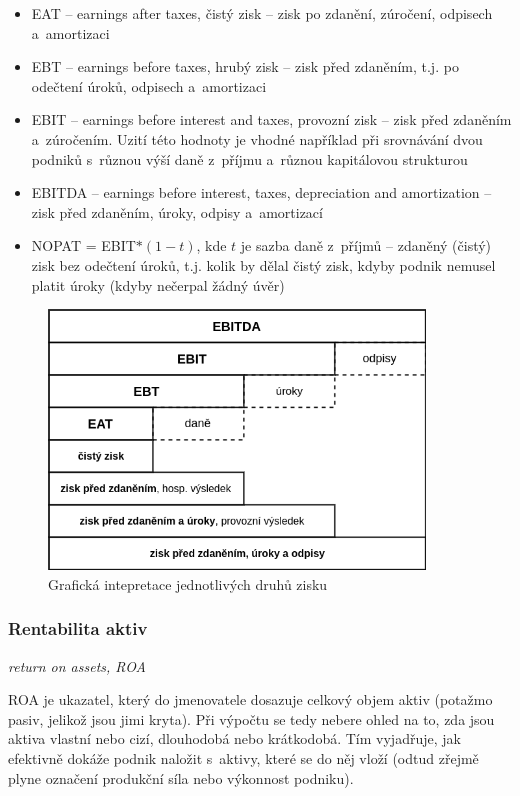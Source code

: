 \begin{itemize}
\item EAT -- earnings after taxes, čistý zisk -- zisk po zdanění, zúročení, odpisech a~amortizaci

\item EBT -- earnings before taxes, hrubý zisk -- zisk před zdaněním, t.j. po odečtení úroků, odpisech a~amortizaci

\item EBIT -- earnings before interest and taxes, provozní zisk -- zisk před zdaněním a~zúročením. Uzití této hodnoty je vhodné například při srovnávání dvou podniků s~různou výší daně z~příjmu a~různou kapitálovou strukturou

\item EBITDA -- earnings before interest, taxes, depreciation and amortization -- zisk před zdaněním, úroky, odpisy a~amortizací

\item NOPAT = EBIT$*(1-t)$, kde $t$ je sazba daně z~příjmů  -- zdaněný (čistý) zisk bez odečtení úroků, t.j. kolik by dělal čistý zisk, kdyby podnik nemusel platit úroky (kdyby nečerpal žádný úvěr)
\end{itemize}


\begin{figure}
  \centering
  \includegraphics[width=10cm]{img/zisk.png}
  \caption{Grafická intepretace jednotlivých druhů zisku}
\end{figure}

\subsubsection{Rentabilita aktiv}
\textit{return on assets, ROA}

ROA je ukazatel, který do jmenovatele dosazuje celkový objem aktiv (potažmo pasiv, jelikož jsou jimi kryta). Při výpočtu se tedy nebere ohled na to, zda jsou aktiva vlastní nebo cizí, dlouhodobá nebo krátkodobá. Tím vyjadřuje, jak efektivně dokáže podnik naložit s~aktivy, které se do něj vloží (odtud zřejmě plyne označení produkční síla nebo výkonnost podniku).

